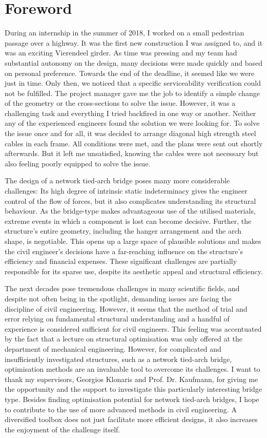 \chapter*{Foreword}

During an internship in the summer of 2018, I worked on a small pedestrian passage over a highway. It was the first new construction I was assigned to, and it was an exciting Vierendeel girder. As time was pressing and my team had substantial autonomy on the design, many decisions were made quickly and based on personal preference. Towards the end of the deadline, it seemed like we were just in time. Only then, we noticed that a specific serviceability verification could not be fulfilled. The project manager gave me the job to identify a simple change of the geometry or the cross-sections to solve the issue. However, it was a challenging task and everything I tried backfired in one way or another. Neither any of the experienced engineers found the solution we were looking for. To solve the issue once and for all, it was decided to arrange diagonal high strength steel cables in each frame. All conditions were met, and the plans were sent out shortly afterwards. But it left me unsatisfied, knowing the cables were not necessary but also feeling poorly equipped to solve the issue.\medskip

The design of a network tied-arch bridge poses many more considerable challenges: Its high degree of intrinsic static indeterminacy gives the engineer control of the flow of forces, but it also complicates understanding its structural behaviour. As the bridge-type makes advantageous use of the utilised materials, extreme events in which a component is lost can become decisive. Further, the structure's entire geometry, including the hanger arrangement and the arch shape, is negotiable. This opens up a large space of plausible solutions and makes the civil engineer's decisions have a far-reaching influence on the structure's efficiency and financial expenses. These significant challenges are partially responsible for its sparse use, despite its aesthetic appeal and structural efficiency. \medskip

The next decades pose tremendous challenges in many scientific fields, and despite not often being in the spotlight, demanding issues are facing the discipline of civil engineering. However, it seems that the method of trial and error relying on fundamental structural understanding and a handful of experience is considered sufficient for civil engineers. This feeling was accentuated by the fact that a lecture on structural optimisation was only offered at the department of mechanical engineering. However, for complicated and insufficiently investigated structures, such as a network tied-arch bridge, optimisation methods are an invaluable tool to overcome its challenges. I want to thank my supervisors, Georgios Klonaris and Prof. Dr. Kaufmann, for giving me the opportunity and the support to investigate this particularly interesting bridge type. Besides finding optimisation potential for network tied-arch bridges, I hope to contribute to the use of more advanced methods in civil engineering. A diversified toolbox does not just facilitate more efficient designs, it also increases the enjoyment of the challenge itself.
